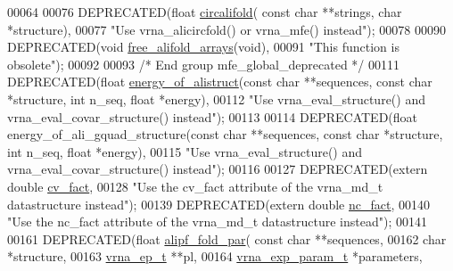 \begin{DoxyCode}
00064 
00076 DEPRECATED(\textcolor{keywordtype}{float} \hyperlink{group__mfe__global__deprecated_gadbd3b0b1c144cbfb4efe704b2b260f96}{circalifold}( \textcolor{keyword}{const} \textcolor{keywordtype}{char} **strings, \textcolor{keywordtype}{char} *structure),
00077           \textcolor{stringliteral}{"Use vrna\_alicircfold() or vrna\_mfe() instead"});
00078 
00090 DEPRECATED(\textcolor{keywordtype}{void} \hyperlink{group__mfe__global__deprecated_ga72095e4554b5d577250ea14c42acc49e}{free\_alifold\_arrays}(\textcolor{keywordtype}{void}),
00091           \textcolor{stringliteral}{"This function is obsolete"});
00092 
00093 \textcolor{comment}{/* End group mfe\_global\_deprecated */}
00111 DEPRECATED(\textcolor{keywordtype}{float} \hyperlink{alifold_8h_a1c48869c03b49a342bf4cbdd61900081}{energy\_of\_alistruct}(\textcolor{keyword}{const} \textcolor{keywordtype}{char} **sequences, \textcolor{keyword}{const} \textcolor{keywordtype}{char} *structure, \textcolor{keywordtype}{int} 
      n\_seq, \textcolor{keywordtype}{float} *energy),
00112            \textcolor{stringliteral}{"Use vrna\_eval\_structure() and vrna\_eval\_covar\_structure() instead"});
00113 
00114 DEPRECATED(\textcolor{keywordtype}{float} energy\_of\_ali\_gquad\_structure(\textcolor{keyword}{const} \textcolor{keywordtype}{char} **sequences, \textcolor{keyword}{const} \textcolor{keywordtype}{char} *structure, \textcolor{keywordtype}{int} n\_seq, \textcolor{keywordtype}{
      float} *energy),
00115           \textcolor{stringliteral}{"Use vrna\_eval\_structure() and vrna\_eval\_covar\_structure() instead"});
00116 
00127 DEPRECATED(\textcolor{keyword}{extern}  \textcolor{keywordtype}{double}  \hyperlink{alifold_8h_af3cbac6ff5d706d6e414677841ddf94c}{cv\_fact},
00128           \textcolor{stringliteral}{"Use the cv\_fact attribute of the vrna\_md\_t datastructure instead"});
00139 DEPRECATED(\textcolor{keyword}{extern}  \textcolor{keywordtype}{double}  \hyperlink{alifold_8h_a502948a122a2af5b914355b1f3ea2f61}{nc\_fact},
00140           \textcolor{stringliteral}{"Use the nc\_fact attribute of the vrna\_md\_t datastructure instead"});
00141 
00161 DEPRECATED(\textcolor{keywordtype}{float} \hyperlink{group__part__func__global__deprecated_gab46954fb0ed3b6d5631e7f9b802978cd}{alipf\_fold\_par}( \textcolor{keyword}{const} \textcolor{keywordtype}{char} **sequences,
00162                       \textcolor{keywordtype}{char} *structure,
00163                       \hyperlink{group__struct__utils__plist_structvrna__elem__prob__s}{vrna\_ep\_t} **pl,
00164                       \hyperlink{group__energy__parameters_structvrna__exp__param__s}{vrna\_exp\_param\_t} *parameters,

\end{DoxyCode}
